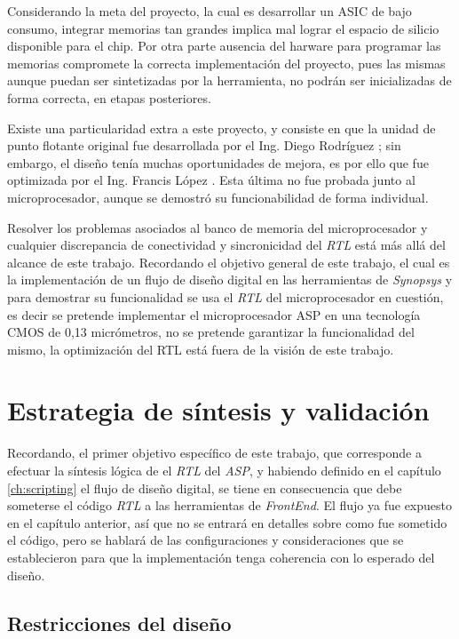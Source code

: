 Considerando la meta del proyecto, la cual es desarrollar un ASIC de bajo consumo, integrar memorias tan grandes implica mal lograr el espacio de silicio disponible para el chip. Por otra parte ausencia del harware para programar las memorias compromete la correcta implementación del proyecto, pues las mismas aunque puedan ser sintetizadas por la herramienta, no podrán ser inicializadas de forma correcta, en etapas posteriores.

Existe una particularidad extra a este proyecto, y consiste en que la unidad de punto flotante original fue desarrollada por el Ing. Diego Rodríguez \cite{Diego2015}; sin embargo, el diseño tenía muchas oportunidades de mejora, es por ello que fue optimizada por el Ing. Francis López \cite{Francis2016}. Esta última no fue probada junto al microprocesador, aunque se demostró su funcionabilidad de forma individual.

Resolver los problemas asociados al banco de memoria del microprocesador y cualquier discrepancia de conectividad y sincronicidad del \textit{RTL} está más allá del alcance de este trabajo. Recordando el objetivo general de este trabajo, el cual es la implementación de un flujo de diseño digital en las herramientas de \textit{Synopsys} y para demostrar su funcionalidad se usa el \textit{RTL} del microprocesador en cuestión, es decir se pretende implementar el microprocesador ASP en una tecnología CMOS de 0,13 micrómetros, no se pretende garantizar la funcionalidad del mismo, la optimización del RTL está fuera de la visión de este trabajo.

\section{Estrategia de síntesis y validación}

Recordando, el primer objetivo específico de este trabajo, que corresponde a efectuar la síntesis lógica de el \textit{RTL} del \textit{ASP}, y habiendo definido en el capítulo \ref{ch:scripting} el flujo de diseño digital, se tiene en consecuencia que debe someterse el código \textit{RTL} a las herramientas de \textit{FrontEnd}. El flujo ya fue expuesto en el capítulo anterior, así que no se entrará en detalles sobre como fue sometido el código, pero se hablará de las configuraciones y consideraciones que se establecieron para que la implementación tenga coherencia con lo esperado del diseño.

\subsection{Restricciones del diseño}
\label{s_sec:const}

